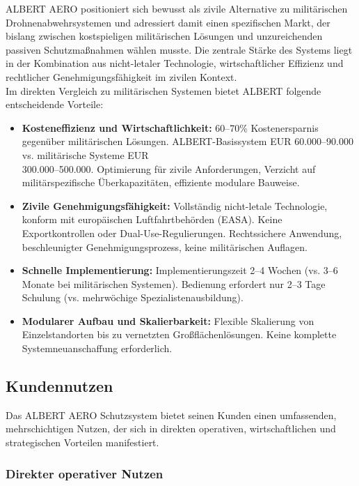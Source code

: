 \documentclass[11pt,a4paper]{article}
\begin{document}
ALBERT AERO positioniert sich bewusst als zivile Alternative zu militärischen Drohnenabwehrsystemen und 
adressiert damit einen spezifischen Markt, der bislang zwischen kostspieligen militärischen Lösungen und 
unzureichenden passiven Schutzmaßnahmen wählen musste. Die zentrale Stärke des Systems liegt in der Kombination 
aus nicht-letaler Technologie, wirtschaftlicher Effizienz und rechtlicher Genehmigungsfähigkeit im zivilen Kontext.
\\
Im direkten Vergleich zu militärischen Systemen bietet ALBERT folgende entscheidende Vorteile:
\begin{itemize}
    \item \textbf{Kosteneffizienz und Wirtschaftlichkeit:} 60–70\% Kostenersparnis gegenüber militärischen Lösungen. ALBERT-Basissystem EUR 60.000–90.000 vs. militärische Systeme EUR \\300.000–500.000. Optimierung für zivile Anforderungen, Verzicht auf militärspezifische Überkapazitäten, effiziente modulare Bauweise.
    
    \item \textbf{Zivile Genehmigungsfähigkeit:} Vollständig nicht-letale Technologie, konform mit europäischen Luftfahrtbehörden (EASA). Keine Exportkontrollen oder Dual-Use-Regulierungen. Rechtssichere Anwendung, beschleunigter Genehmigungsprozess, keine militärischen Auflagen.
    
    \item \textbf{Schnelle Implementierung:} Implementierungszeit 2–4 Wochen (vs. 3–6 Monate bei militärischen Systemen). Bedienung erfordert nur 2–3 Tage Schulung (vs. mehrwöchige Spezialistenausbildung).
    
    \item \textbf{Modularer Aufbau und Skalierbarkeit:} Flexible Skalierung von Einzelstandorten bis zu vernetzten Großflächenlösungen. Keine komplette Systemneuanschaffung erforderlich.
\end{itemize}


\subsection{Kundennutzen}

Das ALBERT AERO Schutzsystem bietet seinen Kunden einen umfassenden, mehrschichtigen Nutzen, der sich in direkten operativen, wirtschaftlichen und strategischen Vorteilen manifestiert.

\subsubsection*{Direkter operativer Nutzen}
\end{document}
